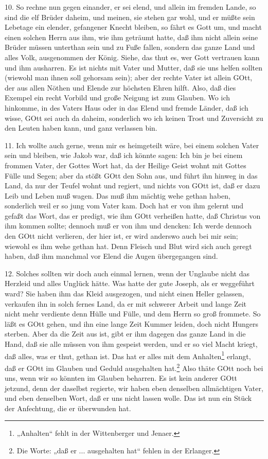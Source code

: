 10. So rechne nun gegen einander, er sei elend, und allein im fremden Lande, so sind die elf Brüder daheim, und meinen, sie stehen gar wohl, und er müßte sein Lebetage ein elender, gefangener Knecht bleiben, so fährt es Gott um, und macht einen solchen Herrn aus ihm, wie ihm geträumt hatte, daß ihm nicht allein seine Brüder müssen unterthan sein und zu Fuße fallen, sondern das ganze Land und alles Volk, ausgenommen der König. Siehe, das thut es, wer Gott vertrauen kann und ihm ausharren. Es ist nichts mit Vater und Mutter, daß sie uns
helfen sollten (wiewohl man ihnen soll gehorsam sein); aber der rechte Vater ist allein GOtt, der aus allen Nöthen und Elende zur höchsten Ehren hilft. Also, daß dies Exempel ein recht Vorbild und große Neigung ist zum Glauben. Wo ich hinkomme, in des Vaters Haus oder in das Elend und fremde Länder, daß ich wisse, GOtt sei auch da daheim, sonderlich wo ich keinen Trost und Zuversicht zu den Leuten haben kann, und ganz verlassen bin.

11. Ich wollte auch gerne, wenn mir es heimgeteilt wäre, bei einem solchen Vater sein und bleiben, wie Jakob war, daß ich könnte sagen: Ich bin je bei einem frommen Vater, der Gottes Wort hat, da der Heilige Geist wohnt mit Gottes Fülle und Segen; aber da stößt GOtt den Sohn aus, und führt ihn hinweg in das Land, da nur der Teufel wohnt und regiert, und nichts von GOtt ist, daß er dazu Leib und Leben muß wagen. Das muß ihm mächtig wehe gethan haben, sonderlich weil er so jung vom Vater kam. Doch hat er von ihm gelernt und gefaßt das Wort, das er predigt, wie ihm GOtt verheißen hatte, daß Christus von ihm kommen sollte; dennoch muß er von ihm und dencken: Ich werde dennoch den GOtt nicht verlieren, der hier ist, er wird anderswo auch bei mir sein; wiewohl es ihm wehe gethan hat. Denn Fleisch und Blut wird sich auch geregt haben, daß ihm manchmal vor Elend die Augen übergegangen sind.

12. Solches sollten wir doch auch einmal lernen, wenn der Unglaube nicht das Herzleid und alles Unglück hätte. Was hatte der gute Joseph, als er weggeführt ward? Sie haben ihm das Kleid ausgezogen, und nicht einen Heller gelassen, verkaufen ihn in solch fernes Land, da er mit schwerer Arbeit und lange Zeit nicht mehr verdiente denn Hülle und Fülle, und dem Herrn so groß frommete. So läßt es GOtt gehen, und ihn eine lange Zeit Kummer leiden, doch nicht Hungers sterben. Aber da die Zeit aus ist, gibt er ihm dagegen das ganze Land in die Hand, daß sie alle müssen von ihm gespeist werden, und er so viel Macht kriegt, daß alles, was er thut, gethan ist. Das hat er alles mit dem Anhalten\footnote{„Anhalten“ fehlt in der Wittenberger und Jenaer.} erlangt, daß er GOtt im Glauben und Geduld ausgehalten hat.\footnote{Die Worte: „daß er ... ausgehalten hat“ fehlen in der Erlanger.} Also thäte GOtt noch bei uns, wenn wir so könnten im Glauben beharren. Es ist kein anderer GOtt jetzund, denn der daselbst regierte, wir haben eben denselben allmächtigen Vater, und eben denselben Wort, daß er uns nicht lassen wolle. Das ist nun ein Stück der Anfechtung, die er überwunden hat.


